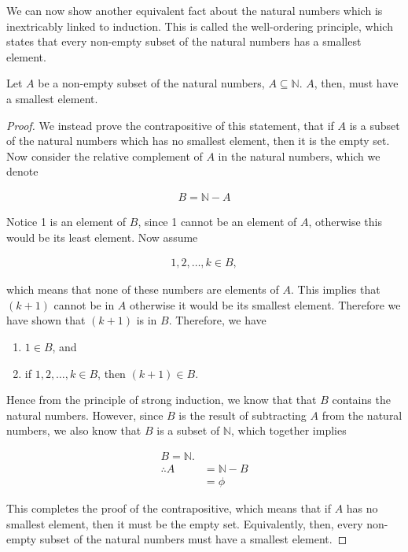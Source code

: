 We can now show another equivalent fact about the natural numbers which is inextricably linked to induction. This is called the well-ordering principle, which states that every non-empty subset of the natural numbers has a smallest element.

\vspace{\baselineskip}
\begin{theorem}
	Let $A$ be a non-empty subset of the natural numbers, $A \subseteq \mathbb{N}$. $A$, then, must have a smallest element.
\end{theorem}
\begin{proof}
	We instead prove the contrapositive of this statement, that if $A$ is a subset of the natural numbers which has no smallest element, then it is the empty set. Now consider the relative complement of $A$ in the natural numbers, which we denote
	
	\begin{align*}
		B = \mathbb{N} - A
	\end{align*}
	
	Notice 1 is an element of $B$, since 1 cannot be an element of $A$, otherwise this would be its least element. Now assume
	
	\begin{align*}
		1, 2, \dots, k \in B,
	\end{align*}
	
	which means that none of these numbers are elements of $A$. This implies that $(k + 1)$ cannot be in $A$ otherwise it would be its smallest element. Therefore we have shown that $(k + 1)$ is in $B$. Therefore, we have
	
	\vspace{\baselineskip}
	\begin{enumerate}
		\item $1 \in B$, and
		\item if $1, 2, \dots, k \in B$, then $(k + 1) \in B$.
	\end{enumerate}
	\vspace{\baselineskip}
	
	Hence from the principle of strong induction, we know that that $B$ contains the natural numbers. However, since $B$ is the result of subtracting $A$ from the natural numbers, we also know that $B$ is a subset of $\mathbb{N}$, which together implies
	
	\begin{align*}
		B = \mathbb{N}. \\
		\therefore A &= \mathbb{N} - B \\
		&= \phi
	\end{align*}
	
	This completes the proof of the contrapositive, which means that if $A$ has no smallest element, then it must be the empty set. Equivalently, then, every non-empty subset of the natural numbers must have a smallest element. 
\end{proof}
\vspace{\baselineskip}

